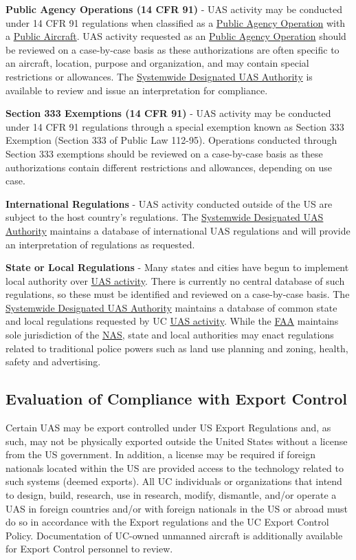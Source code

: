 \documentclass[
]{book}
\begin{document}
\textbf{Public Agency Operations (14 CFR 91)} - UAS activity may be conducted under 14 CFR 91 regulations when classified as a \protect\hyperlink{PAO}{Public Agency Operation} with a \protect\hyperlink{PA}{Public Aircraft}. UAS activity requested as an \protect\hyperlink{PAO}{Public Agency Operation} should be reviewed on a case-by-case basis as these authorizations are often specific to an aircraft, location, purpose and organization, and may contain special restrictions or allowances. The \protect\hyperlink{SDA}{Systemwide Designated UAS Authority} is available to review and issue an interpretation for compliance.

\textbf{Section 333 Exemptions (14 CFR 91)} - UAS activity may be conducted under 14 CFR 91 regulations through a special exemption known as Section 333 Exemption (Section 333 of Public Law 112-95). Operations conducted through Section 333 exemptions should be reviewed on a case-by-case basis as these authorizations contain different restrictions and allowances, depending on use case.

\textbf{International Regulations} - UAS activity conducted outside of the US are subject to the host country's regulations. The \protect\hyperlink{SDA}{Systemwide Designated UAS Authority} maintains a database of international UAS regulations and will provide an interpretation of regulations as requested.

\textbf{State or Local Regulations} - Many states and cities have begun to implement local authority over \protect\hyperlink{UASactivity}{UAS activity}. There is currently no central database of such regulations, so these must be identified and reviewed on a case-by-case basis. The \protect\hyperlink{SDA}{Systemwide Designated UAS Authority} maintains a database of common state and local regulations requested by UC \protect\hyperlink{UASactivity}{UAS activity}. While the \protect\hyperlink{FAA}{FAA} maintains sole jurisdiction of the \protect\hyperlink{NAS}{NAS}, state and local authorities may enact regulations related to traditional police powers such as land use planning and zoning, health, safety and advertising.

\hypertarget{ss-expcon}{%
\subsection{Evaluation of Compliance with Export Control}\label{ss-expcon}}

Certain UAS may be export controlled under US Export Regulations and, as such, may not be physically exported outside the United States without a license from the US government. In addition, a license may be required if foreign nationals located within the US are provided access to the technology related to such systems (deemed exports). All UC individuals or organizations that intend to design, build, research, use in research, modify, dismantle, and/or operate a UAS in foreign countries and/or with foreign nationals in the US or abroad must do so in accordance with the Export regulations and the UC Export Control Policy. Documentation of UC-owned unmanned aircraft is additionally available for Export Control personnel to review.
\end{document}
